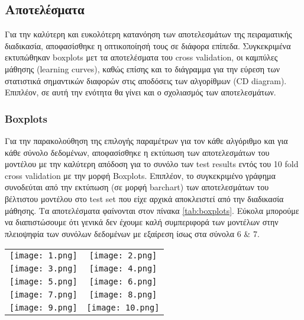 \subsection{Αποτελέσματα}
Για την καλύτερη και ευκολότερη κατανόηση των αποτελεσμάτων της πειραματικής διαδικασία, αποφασίσθηκε
η οπτικοποίησή τους σε διάφορα επίπεδα. Συγκεκριμένα εκτυπώθηκαν boxplots μετ τα αποτελέσματα του cross validation, οι καμπύλες μάθησης (learning curves), καθώς επίσης και το διάγραμμα για την εύρεση των στατιστικά σημαντικών διαφορών στις αποδόσεις των αλγορίθμων (CD diagram). Επιπλέον, σε αυτή την ενότητα θα γίνει και ο σχολιασμός των αποτελεσμάτων. 

\subsubsection{Boxplots}
Για την παρακολούθηση της επιλογής παραμέτρων για τον κάθε αλγόριθμο και για κάθε σύνολο δεδομένων, αποφασίσθηκε η εκτύπωση των αποτελεσμάτων του μοντέλου με την καλύτερη απόδοση για το συνόλο των test results εντός του 10 fold cross validation με την μορφή Boxplots. Επιπλέον, το συγκεκριμένο γράφημα συνοδεύται από την εκτύπωση (σε μορφή barchart) των αποτελεσμάτων του βέλτιστου μοντέλου στο test set που είχε αρχικά αποκλειστεί από την διαδικασία μάθησης. Τα αποτελέσματα φαίνονται στον πίνακα \ref{tab:boxplots}. Εύκολα μπορούμε να διαπιστώσουμε
ότι γενικά δεν έχουμε καλή συμπεριφορά των μοντέλων στην πλειοψηφία των συνόλων δεδομένων με εξαίρεση ίσως στα σύνολα 6 \& 7.

\begin{table*}
	\centering
	\caption{Αποτελέσματα από την εκπαίδευση των αλγορίθμων και από την αξιολόγησή τους στο test set του κάθε συνόλου δεδομένων.}
	\label{tab:boxplots}
	\begin{tabular}{cc}
		\texttt{[image: 1.png]} &
		\texttt{[image: 2.png]} 
		 \\ %
		\texttt{[image: 3.png]} &
		\texttt{[image: 4.png]} 
		 \\ %
		\texttt{[image: 5.png]} &
		\texttt{[image: 6.png]} 
		 \\ %
		\texttt{[image: 7.png]} &
		\texttt{[image: 8.png]} 
		 \\ %
		\texttt{[image: 9.png]} &
		\texttt{[image: 10.png]}
	\end{tabular}
\end{table*}


